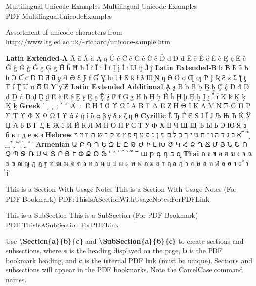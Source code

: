 \documentclass[letterpaper,MMMyyyy,nonstopmode]{simpleresumecv}
\newcommand{\Code}[1]{\mbox{\textbf{#1}}}
\newcommand{\CodeCommand}[1]{\mbox{\textbf{\textbackslash{#1}}}}
\begin{document}
\begin{Body}

\Section
{Multilingual Unicode Examples}
{Multilingual Unicode Examples}
{PDF:MultilingualUnicodeExamples}

\BulletItem
Assortment of unicode characters from
\href{http://www.ltg.ed.ac.uk/~richard/unicode-sample.html}
{\url{http://www.ltg.ed.ac.uk/~richard/unicode-sample.html}}

\begin{Detail}
\Item
\textbf{Latin Extended-A}
Ā ā Ă ă Ą ą Ć ć Ĉ ĉ Ċ ċ Č č Ď ď Đ đ Ē ē Ĕ ĕ Ė ė Ę ę Ě ě Ĝ ĝ Ğ ğ Ġ ġ Ģ ģ Ĥ ĥ Ħ ħ Ĩ ĩ Ī ī Ĭ ĭ Į į İ ı Ĳ ĳ Ĵ ĵ
\textbf{Latin Extended-B}
ƀ Ɓ Ƃ ƃ Ƅ ƅ Ɔ Ƈ ƈ Ɖ Ɗ Ƌ ƌ ƍ Ǝ Ə Ɛ Ƒ ƒ Ɠ Ɣ ƕ Ɩ Ɨ Ƙ ƙ ƚ ƛ Ɯ Ɲ ƞ Ɵ Ơ ơ Ƣ ƣ Ƥ ƥ Ʀ Ƨ ƨ Ʃ ƪ ƫ Ƭ ƭ Ʈ Ư ư Ʊ Ʋ Ƴ ƴ Ƶ
\textbf{Latin Extended Additional}
Ḁ ḁ Ḃ ḃ Ḅ ḅ Ḇ ḇ Ḉ ḉ Ḋ ḋ Ḍ ḍ Ḏ ḏ Ḑ ḑ Ḓ ḓ Ḕ ḕ Ḗ ḗ Ḙ ḙ Ḛ ḛ Ḝ ḝ Ḟ ḟ Ḡ ḡ Ḣ ḣ Ḥ ḥ Ḧ ḧ Ḩ ḩ Ḫ ḫ Ḭ ḭ Ḯ ḯ Ḱ ḱ Ḳ ḳ Ḵ ḵ
\textbf{Greek}
ʹ ͵ ͺ ; ΄ ΅ Ά · Έ Ή Ί Ό Ύ Ώ ΐ Α Β Γ Δ Ε Ζ Η Θ Ι Κ Λ Μ Ν Ξ Ο Π Ρ Σ Τ Υ Φ Χ Ψ Ω Ϊ Ϋ ά έ ή ί ΰ α β γ δ ε ζ η θ
\textbf{Cyrillic}
Ё Ђ Ѓ Є Ѕ І Ї Ј Љ Њ Ћ Ќ Ў Џ А Б В Г Д Е Ж З И Й К Л М Н О П Р С Т У Ф Х Ц Ч Ш Щ Ъ Ы Ь Э Ю Я а б в г д е ж з
\textbf{Hebrew}
א ב ג ד ה ו ז ח ט י ך כ ל ם מ ן נ ס ע ף פ ץ צ ק ר ש ת װ ױ ײ ֝ ֞ ֟ ֠ ֡ ֣ ֤ ֥ ֦ ֧ ֨ ֩ ֪ ֫ ֬ ֭ ֮ ֯ ְ ֱ ֒ ֓ ֔
\textbf{Armenian}
{\UseSecondaryFont
Ա Բ Գ Դ Ե Զ Է Ը Թ Ժ Ի Լ Խ Ծ Կ Հ Ձ Ղ Ճ Մ Յ Ն Շ Ո Չ Պ Ջ Ռ Ս Վ Տ Ր Ց Ւ Փ Ք Օ Ֆ ՙ ՚ ՛ ՜ ՝ ՞ ՟ ա բ գ դ ե զ}
\textbf{Thai}
{\UseSecondaryFont
ก ข ฃ ค ฅ ฆ ง จ ฉ ช ซ ฌ ญ ฎ ฏ ฐ ฑ ฒ ณ ด ต ถ ท ธ น บ ป ผ ฝ พ ฟ ภ ม ย ร ฤ ล ฦ ว ศ ษ ส ห ฬ อ ฮ ฯ ะ ั า ำ ิ}
\end{Detail}

\newpage


\begingroup
\color{red}

\Section
{This is a\newline
Section\newline
With\newline
Usage Notes}
{This is a Section With Usage Notes (For PDF Bookmark)}
{PDF:ThisIsASectionWithUsageNotes:ForPDFLink}

\SubSection
{This is a SubSection}
{This is a SubSection (For PDF Bookmark)}
{PDF:ThisIsASubSection:ForPDFLink}

\BigGap
\BulletItem
Use \CodeCommand{Section\{a\}\{b\}\{c\}} and
\CodeCommand{SubSection\{a\}\{b\}\{c\}}
to create sections and subsections, where
\Code{a} is the heading displayed on the page,
\Code{b} is the PDF bookmark heading, and
\Code{c} is the internal PDF link (must be unique).
Sections and subsections will appear in the PDF bookmarks.
Note the CamelCase command names.


\end{Body}
\end{document}

